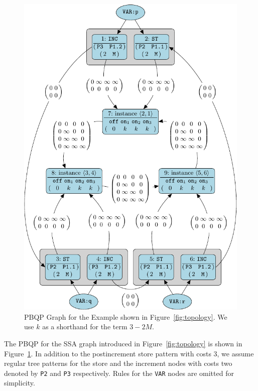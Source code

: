 \begin{figure}


    \includegraphics{fig/pgf-fig009}
  \caption{PBQP Graph for the Example shown in
    Figure~\ref{fig:topology}. We use $k$ as a shorthand for the term
    $3-2M$.}\label{fig:pbqpinst}
\end{figure}

The PBQP for the SSA graph introduced in Figure~\ref{fig:topology} is
shown in Figure~\ref{fig:pbqpinst}. In addition to the postincrement
store pattern with costs 3, we assume regular tree patterns for the
store and the increment nodes with costs two denoted by \texttt{P2}
and \texttt{P3} respectively. Rules for the \texttt{VAR} nodes are
omitted for simplicity.

